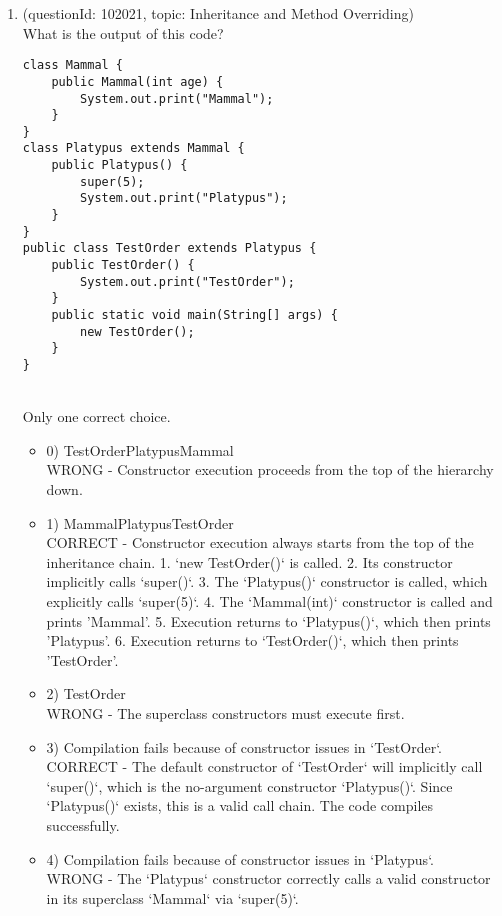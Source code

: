 \documentclass[12pt]{article}
\begin{document}
\begin{enumerate}[label=(\arabic*)]
\begin{itemize}
\end{itemize}
\item (questionId: 102021, topic: Inheritance and Method Overriding) \\ 
What is the output of this code?
\begin{verbatim}
class Mammal {
    public Mammal(int age) {
        System.out.print("Mammal");
    }
}
class Platypus extends Mammal {
    public Platypus() {
        super(5);
        System.out.print("Platypus");
    }
}
public class TestOrder extends Platypus {
    public TestOrder() {
        System.out.print("TestOrder");
    }
    public static void main(String[] args) {
        new TestOrder();
    }
}
\end{verbatim}
\\ \noindent Only one correct choice. 
\begin{itemize}
\item 0) TestOrderPlatypusMammal
 \\ 
WRONG - Constructor execution proceeds from the top of the hierarchy down.

\item 1) MammalPlatypusTestOrder
 \\ 
CORRECT - Constructor execution always starts from the top of the inheritance chain. 1. `new TestOrder()` is called. 2. Its constructor implicitly calls `super()`. 3. The `Platypus()` constructor is called, which explicitly calls `super(5)`. 4. The `Mammal(int)` constructor is called and prints 'Mammal'. 5. Execution returns to `Platypus()`, which then prints 'Platypus'. 6. Execution returns to `TestOrder()`, which then prints 'TestOrder'.

\item 2) TestOrder
 \\ 
WRONG - The superclass constructors must execute first.

\item 3) Compilation fails because of constructor issues in `TestOrder`.
 \\ 
CORRECT - The default constructor of `TestOrder` will implicitly call `super()`, which is the no-argument constructor `Platypus()`. Since `Platypus()` exists, this is a valid call chain. The code compiles successfully.

\item 4) Compilation fails because of constructor issues in `Platypus`.
 \\ 
WRONG - The `Platypus` constructor correctly calls a valid constructor in its superclass `Mammal` via `super(5)`.


\end{itemize}
\end{enumerate}
\end{document}
